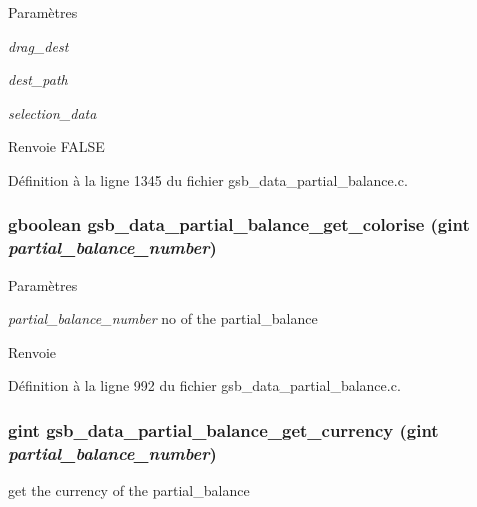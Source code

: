 \begin{DoxyParams}{Paramètres}
\item[{\em drag\_\-dest}]\item[{\em dest\_\-path}]\item[{\em selection\_\-data}]\end{DoxyParams}
\begin{DoxyReturn}{Renvoie}
FALSE 
\end{DoxyReturn}


Définition à la ligne 1345 du fichier gsb\_\-data\_\-partial\_\-balance.c.

\subsubsection[{gsb\_\-data\_\-partial\_\-balance\_\-get\_\-colorise}]{\setlength{\rightskip}{0pt plus 5cm}gboolean gsb\_\-data\_\-partial\_\-balance\_\-get\_\-colorise (gint {\em partial\_\-balance\_\-number})}\label{gsb__data__partial__balance_8h_aa45781dd7d5f787326c68fd88af26104}

\begin{DoxyParams}{Paramètres}
\item[{\em partial\_\-balance\_\-number}]no of the partial\_\-balance\end{DoxyParams}
\begin{DoxyReturn}{Renvoie}

\end{DoxyReturn}


Définition à la ligne 992 du fichier gsb\_\-data\_\-partial\_\-balance.c.

\subsubsection[{gsb\_\-data\_\-partial\_\-balance\_\-get\_\-currency}]{\setlength{\rightskip}{0pt plus 5cm}gint gsb\_\-data\_\-partial\_\-balance\_\-get\_\-currency (gint {\em partial\_\-balance\_\-number})}\label{gsb__data__partial__balance_8h_adc46165b029838315336eabdd6df6e63}
get the currency of the partial\_\-balance


